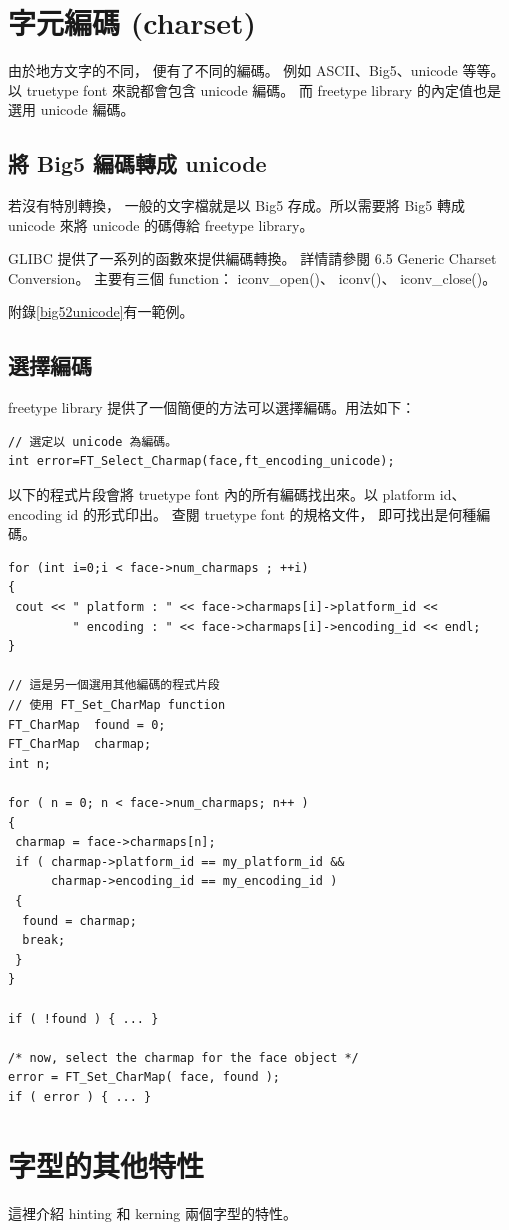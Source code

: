 \documentclass[12pt,a4]{article}
\begin{document}
\begin{CJK}{UTF8}{cwmu}
\section{字元編碼 (charset)}
由於地方文字的不同， 便有了不同的編碼。 例如 ASCII、Big5、unicode 等等。
以 truetype font 來說都會包含 unicode 編碼。 而 freetype library 的內定值也是選用 
unicode 編碼。
\subsection{將 Big5 編碼轉成 unicode}
若沒有特別轉換， 一般的文字檔就是以 Big5 存成。所以需要將 Big5 轉成 unicode 
來將 unicode 的碼傳給 freetype library。

GLIBC 提供了一系列的函數來提供編碼轉換。 詳情請參閱\cite{glibc}
6.5 Generic Charset Conversion。 主要有三個 function： iconv\_{}open()、 iconv()、 
iconv\_{}close()。

附錄\ref{big52unicode}有一範例。
\subsection{選擇編碼}
freetype library 提供了一個簡便的方法可以選擇編碼。用法如下：
\begin{Verbatim}[commandchars=@\[\]]
// 選定以 unicode 為編碼。
int error=FT_Select_Charmap(face,ft_encoding_unicode);
\end{Verbatim}
以下的程式片段會將 truetype font 內的所有編碼找出來。以 platform id、 encoding id
的形式印出。 查閱 truetype font 的規格文件， 即可找出是何種編碼。
\begin{Verbatim}[commandchars=@\$?]
for (int i=0;i < face->num_charmaps ; ++i)
{
 cout << " platform : " << face->charmaps[i]->platform_id << 
         " encoding : " << face->charmaps[i]->encoding_id << endl;
}

// 這是另一個選用其他編碼的程式片段
// 使用 FT_Set_CharMap function
FT_CharMap  found = 0;
FT_CharMap  charmap;
int n;

for ( n = 0; n < face->num_charmaps; n++ )
{
 charmap = face->charmaps[n];
 if ( charmap->platform_id == my_platform_id &&
      charmap->encoding_id == my_encoding_id )
 {
  found = charmap;
  break;
 }
}

if ( !found ) { ... }

/* now, select the charmap for the face object */
error = FT_Set_CharMap( face, found );
if ( error ) { ... }
\end{Verbatim}
\newpage
\section{字型的其他特性}
這裡介紹 hinting 和 kerning 兩個字型的特性。

\end{CJK}
\end{document}
